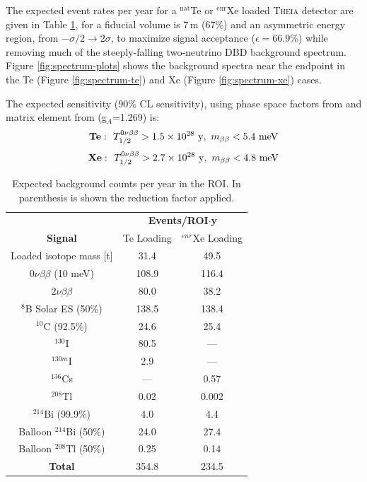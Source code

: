 The expected event rates per year for a $^\mathrm{nat}$Te or $^\mathrm{enr}$Xe loaded \textsc{Theia} detector are given in Table \ref{tab:counts}, for a fiducial volume is 7\,m (67\%) and an asymmetric energy region,  from $-\sigma/2 \to 2\sigma$, to maximize signal acceptance ($\epsilon=66.9$\%) while removing much of the steeply-falling two-neutrino DBD background spectrum. Figure \ref{fig:spectrum-plots} shows the background spectra near the endpoint in the Te (Figure \ref{fig:spectrum-te}) and Xe (Figure \ref{fig:spectrum-xe}) cases.

The expected sensitivity (90\% CL sensitivity), using phase space factors from \cite{2012PhRvC..85c4316K} and matrix element from \cite{Barea:2013wb} (g$_{A}$=1.269) is:
\[
\mathrm{\bf Te:}~~
  T_{1/2}^{0\nu\beta\beta} > 1.5\times10^{28}~\mathrm{y},~
  m_{\beta\beta} < 5.4~\mathrm{meV}
\]
\[
\mathrm{\bf Xe:}~~
  T_{1/2}^{0\nu\beta\beta} > 2.7\times10^{28}~\mathrm{y},~
  m_{\beta\beta} < 4.8~\mathrm{meV}
\]


\begin{table}
\centering
\begin{tabular}{ccc}
\toprule
                          & \multicolumn{2}{c}{\bf Events/ROI$\cdot$y} \\
{\bf Signal}              & Te Loading & $^{enr}$Xe Loading \\
Loaded isotope mass [t] & 31.4 & 49.5 \\
\midrule
$0\nu\beta\beta$ (10 meV) & 108.9       & 116.4      \\
\midrule
$2\nu\beta\beta$          & 80.0       & 38.2       \\
$^8$B Solar ES  (50\%)           & 138.5      & 138.4      \\
$^{10}$C  (92.5\%)                & 24.6       & 25.4       \\
$^{130}$I                 & 80.5       & ---        \\
$^{130m}$I                & 2.9        & ---        \\
$^{136}$Cs                & ---        & 0.57       \\
$^{208}$Tl                & 0.02       & 0.002      \\
$^{214}$Bi  (99.9\%)               & 4.0        & 4.4        \\
Balloon $^{214}$Bi  (50\%)       & 24.0       & 27.4       \\
Balloon $^{208}$Tl  (50\%)      & 0.25       & 0.14       \\
\midrule
{\bf Total}               & 354.8      & 234.5      \\
\bottomrule
\end{tabular}
\caption{Expected background counts per year in the ROI. In parenthesis is shown the reduction factor applied.}
\label{tab:counts}
\end{table}

